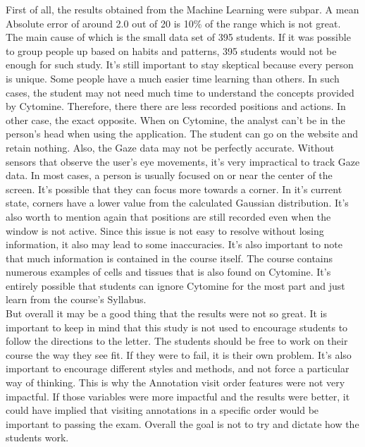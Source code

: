 \documentclass[a4paper,11pt]{report}
\numberwithin{figure}{section} %
\begin{document}
        First of all, the results obtained from the Machine Learning were subpar.
        A mean Absolute error of around 2.0 out of 20 is 10\% of the range which is not great.
        The main cause of which is the small data set of 395 students.
        If it was possible to group people up based on habits and patterns, 395 students would not be enough for such study.
        It's still important to stay skeptical because every person is unique.
        Some people have a much easier time learning than others.
        In such cases, the student may not need much time to understand the concepts provided by Cytomine.
        Therefore, there there are less recorded positions and actions.
        In other case, the exact opposite.
        When on Cytomine, the analyst can't be in the person's head when using the application.
        The student can go on the website and retain nothing.
        Also, the Gaze data may not be perfectly accurate.
        Without sensors that observe the user's eye movements, it's very impractical to track Gaze data.
        In most cases, a person is usually focused on or near the center of the screen.
        It's possible that they can focus more towards a corner.
        In it's current state, corners have a lower value from the calculated Gaussian distribution.
        It's also worth to mention again that positions are still recorded even when the window is not active.
        Since this issue is not easy to resolve without losing information, it also may lead to some inaccuracies.
        It's also important to note that much information is contained in the course itself.
        The course contains numerous examples of cells and tissues that is also found on Cytomine.
        It's entirely possible that students can ignore Cytomine for the most part and just learn from the course's Syllabus.\\


        But overall it may be a good thing that the results were not so great.
        It is important to keep in mind that this study is not used to encourage students to follow the directions to the letter.
        The students should be free to work on their course the way they see fit.
        If they were to fail, it is their own problem.
        It's also important to encourage different styles and methods, and not force a particular way of thinking.
        This is why the Annotation visit order features were not very impactful.
        If those variables were more impactful and the results were better, it could have implied that visiting annotations in a specific order would be important to passing the exam.
        Overall the goal is not to try and dictate how the students work.\\
\end{document}
